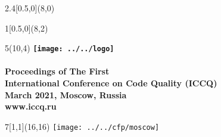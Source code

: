 \documentclass[12pt]{article}
\begin{document}
\ttfamily

\begin{textblock}{2.4}[0.5,0](8,0)
\end{textblock}

\begin{textblock}{1}[0.5,0](8,2)
\end{textblock}

\begin{textblock}{5}(10,4)
  \fontsize{16}{16}\selectfont\textbf{%
    \texttt{[image: ../../logo]}
    \\
    \vspace{0.5in}
    \\
    Proceedings of The First \\
    International Conference on Code Quality (ICCQ) \\
    March 2021, Moscow, Russia\\
    www.iccq.ru
  }
\end{textblock}

\begin{textblock}{7}[1,1](16,16)
  \texttt{[image: ../../cfp/moscow]}
\end{textblock}
\end{document}
